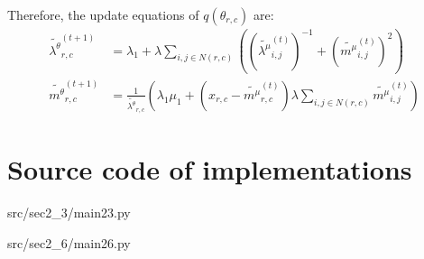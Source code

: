 \documentclass[12pt]{article}
\newenvironment{problem}[2][Problem]{\begin{trivlist}
\item[\hskip \labelsep {\bfseries #1}\hskip \labelsep {\bfseries #2.}]}{\end{trivlist}}
\begin{document}
\begin{problem}{2.9.25}
Therefore, the update equations of $q(\theta_{r,c})$ are:
\begin{align*}
    \tilde{\lambda^{\theta}}_{r,c}^{(t+1)}
    &= \lambda_1 + \lambda\sum_{i,j \in N(r,c)}((\tilde{\lambda^{\mu}}^{(t)}_{i,j})^{-1} + (\tilde{m^{\mu}}_{i,j}^{(t)})^2) \\
    \tilde{m^{\theta}}_{r,c}^{(t+1)}
    &= \frac{1}{\tilde{\lambda^{\theta}}_{r,c}}
    (\lambda_1\mu_1 + (x_{r,c} - \tilde{m^{\mu}}_{r,c}^{(t)})\lambda\sum_{i,j \in N(r,c)}\tilde{m^{\mu}}_{i,j}^{(t)})
\end{align*}
\end{problem} %



\pagebreak
\appendix
\section{Source code of implementations}

                 {src/sec2_3/main23.py}

                 {src/sec2_6/main26.py}
\pagebreak

\end{document}
